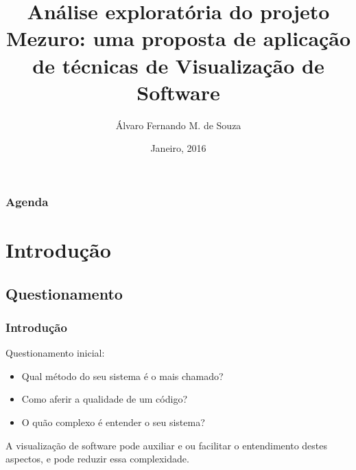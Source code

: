 \documentclass{beamer}
\title[Visualização de Software - Mezuro]{Análise exploratória do projeto
Mezuro: uma proposta de aplicaç\~ao de técnicas de Visualizaç\~ao de Software}
\author{Álvaro Fernando M. de Souza} %
\institute[UnB-FGA] %
{
Universidade de Brasília - Faculdade Gama \\ %
\medskip
\textit{alvarofernandoms@gmail.com} %
}
\date{Janeiro, 2016} %
\begin{document}
\begin{frame}
\titlepage %
\end{frame}

\begin{frame}
\frametitle{Agenda} %
\tableofcontents %
\end{frame}


\section{Introdução} %

\subsection{Questionamento}

\begin{frame}
\frametitle{Introdução}
Questionamento inicial: \\
\begin{itemize}
\item Qual método do seu sistema é o mais chamado?
\item Como aferir a qualidade de um código?
\item O quão complexo é entender o seu sistema?
\end{itemize}
A visualização de software pode auxiliar e ou facilitar o entendimento destes aspectos, e pode reduzir essa complexidade.
\end{frame}
\end{document}
